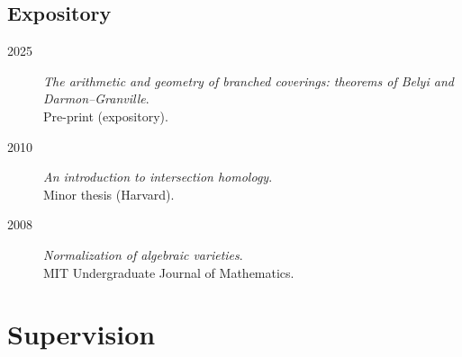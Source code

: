 \documentclass[11pt]{article}
\begin{document}
\subsection*{Expository}
\label{sec:orgb7ed290}
\label{org2283703}
\begin{description}
\item[{2025}] \emph{The arithmetic and geometry of branched coverings: theorems of Belyi and Darmon--Granville}.\\
Pre-print (expository).
\item[{2010}] \emph{An introduction to intersection homology}.\\
Minor thesis (Harvard).
\item[{2008}] \emph{Normalization of algebraic varieties}.\\
MIT Undergraduate Journal of Mathematics.
\end{description}
\section*{Supervision}
\label{sec:org7648a0e}
\end{document}

